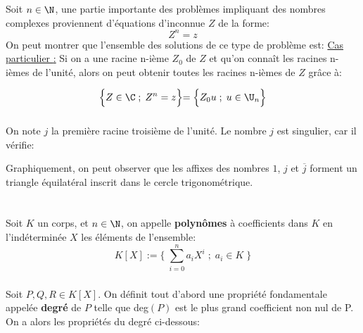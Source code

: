 \subsection*{}
Soit \(n \in \N\), une partie importante des problèmes impliquant des nombres complexes proviennent d'équations d'inconnue \(Z\) de la forme:
\[
   Z^n = z
\]
On peut montrer que l'ensemble des solutions de ce type de problème est:
\underline{Cas particulier {:}}
Si on a une racine n-ième \(Z_0\) de \(Z\) et qu'on connaît les racines n-ièmes de l'unité, alors on peut obtenir toutes les racines n-ièmes de \(Z\) grâce à:

\[
   \Bigl\{ Z \in \C \; ; \; Z^n = z \Bigl\} = \Bigl\{ Z_0u \; ; \; u \in \U_n \Bigl\}   
\]

\subsection*{}
On note \(j\) la première racine troisième de l'unité.
Le nombre \(j\) est singulier, car il vérifie:

Graphiquement, on peut observer que les affixes des nombres \(1\), \(j\) et \(\overline{j}\) forment un triangle équilatéral inscrit dans le cercle trigonométrique.

\chapter*{} %

\subsection*{}

Soit \(K\) un corps, et \(n \in \N\), on appelle \textbf{polynômes} à coefficients dans \(K\) en l'indéterminée \(X\) les éléments de l'ensemble:
\[
   K[X] := \Biggl\{ \; \sum_{i=0}^n a_{i}X^{i} \; ; \; a_i \in K \;\Biggl\}
\]

\subsection*{}
Soit \(P, Q, R \in K[X]\).\+
On définit tout d'abord une propriété fondamentale appelée \textbf{degré} de \(P\) telle que deg\((P)\) est le plus grand coefficient non nul de P.
On a alors les propriétés du degré ci-dessous:

